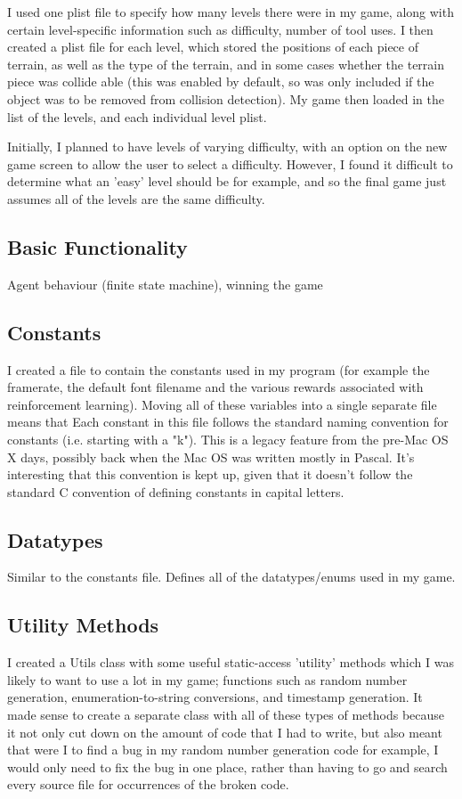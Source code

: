\documentclass[a4paper,oneside]{report}
\begin{document}
I used one plist file to specify how many levels there were in my game, along with certain level-specific information such as difficulty, number of tool uses. I then created a plist file for each level, which stored the positions of each piece of terrain, as well as the type of the terrain, and in some cases whether the terrain piece was collide able (this was enabled by default, so was only included if the object was to be removed from collision detection). My game then loaded in the list of the levels, and each individual level plist. 

Initially, I planned to have levels of varying difficulty, with an option on the new game screen to allow the user to select a difficulty. However, I found it difficult to determine what an 'easy' level should be for example, and so the final game just assumes all of the levels are the same difficulty.

\subsection{Basic Functionality} Agent behaviour (finite state machine), winning the game

\subsection{Constants} I created a file to contain the constants used in my program (for example the framerate, the default font filename and the various rewards associated with reinforcement learning). Moving all of these variables into a single separate file means that Each constant in this file follows the standard naming convention for constants (i.e. starting with a "k"). This is a legacy feature from the pre-Mac OS X days, possibly back when the Mac OS was written mostly in Pascal. It's interesting that this convention is kept up, given that it doesn't follow the standard C convention of defining constants in capital letters. 

\subsection{Datatypes} Similar to the constants file. Defines all of the datatypes/enums used in my game.

\subsection{Utility Methods} I created a Utils class with some useful static-access 'utility' methods which I was likely to want to use a lot in my game; functions such as random number generation, enumeration-to-string conversions, and timestamp generation. It made sense to create a separate class with all of these types of methods because it not only cut down on the amount of code that I had to write, but also meant that were I to find a bug in my random number generation code for example, I would only need to fix the bug in one place, rather than having to go and search every source file for occurrences of the broken code. 
		
\end{document}
